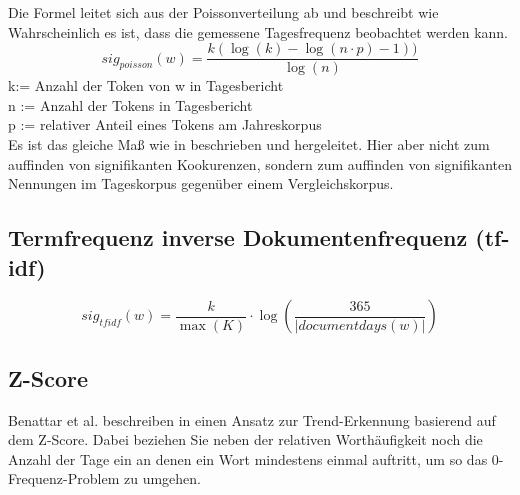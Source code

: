 Die Formel leitet sich aus der Poissonverteilung ab und beschreibt wie Wahrscheinlich es ist, dass die gemessene Tagesfrequenz beobachtet werden kann. 
\begin{equation}
sig_{poisson}(w) = \frac{k(\log(k)-\log(n\cdot p) -1 ))}{\log(n)}
\end{equation}
k:= Anzahl der Token von w in Tagesbericht\\
n := Anzahl der Tokens in Tagesbericht\\
p := relativer Anteil eines Tokens am Jahreskorpus\\
Es ist das gleiche Maß wie in \cite[S. 338-340]{heyer06} beschrieben und hergeleitet. Hier aber nicht zum auffinden von signifikanten Kookurenzen, sondern zum auffinden von signifikanten Nennungen im Tageskorpus gegenüber einem Vergleichskorpus.\\

\subsection{Termfrequenz inverse Dokumentenfrequenz (tf-idf)}
 \begin{equation}
sig_{tf idf}(w) = \frac{k}{\max(K)} \cdot \log ( \frac{365}{|documentdays(w)|})
\end{equation}

\subsection{Z-Score}
Benattar et al. beschreiben in \cite{benattar2011trend} einen Ansatz zur Trend-Erkennung basierend auf dem Z-Score. Dabei beziehen Sie neben der relativen Worthäufigkeit noch die Anzahl der Tage ein an denen ein Wort mindestens einmal auftritt, um so das 0-Frequenz-Problem zu umgehen.


